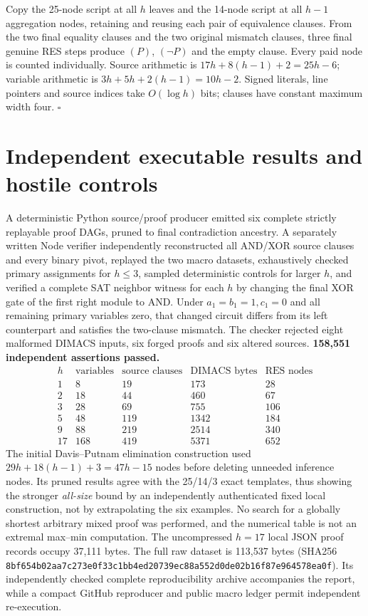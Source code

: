 \documentclass[11pt]{article}
\begin{document}
Copy the 25-node script at all $h$ leaves and the 14-node script at all $h-1$ aggregation nodes, retaining and reusing each pair of equivalence clauses. From the two final equality clauses and the two original mismatch clauses, three final genuine RES steps produce $(P)$, $(\neg P)$ and the empty clause. Every paid node is counted individually. Source arithmetic is $17h+8(h-1)+2=25h-6$; variable arithmetic is $3h+5h+2(h-1)=10h-2$. Signed literals, line pointers and source indices take $O(\log h)$ bits; clauses have constant maximum width four. \hfill$\square$

\section*{Independent executable results and hostile controls}
A deterministic Python source/proof producer emitted six complete strictly replayable proof DAGs, pruned to final contradiction ancestry. A separately written Node verifier independently reconstructed all AND/XOR source clauses and every binary pivot, replayed the two macro datasets, exhaustively checked primary assignments for $h\le3$, sampled deterministic controls for larger $h$, and verified a complete SAT neighbor witness for each $h$ by changing the final XOR gate of the first right module to AND. Under $a_1=b_1=1,c_1=0$ and all remaining primary variables zero, that changed circuit differs from its left counterpart and satisfies the two-clause mismatch. The checker rejected eight malformed DIMACS inputs, six forged proofs and six altered sources. \textbf{158,551 independent assertions passed.}
\[
\begin{array}{c|r|r|r|r}
h&\text{variables}&\text{source clauses}&\text{DIMACS bytes}&\text{RES nodes}\\\hline
1&8&19&173&28\\2&18&44&460&67\\3&28&69&755&106\\
5&48&119&1342&184\\9&88&219&2514&340\\17&168&419&5371&652
\end{array}
\]
The initial Davis--Putnam elimination construction used $29h+18(h-1)+3=47h-15$ nodes before deleting unneeded inference nodes. Its pruned results agree with the 25/14/3 exact templates, thus showing the stronger \emph{all-size} bound by an independently authenticated fixed local construction, not by extrapolating the six examples. No search for a globally shortest arbitrary mixed proof was performed, and the numerical table is not an extremal max--min computation. The uncompressed $h=17$ local JSON proof records occupy 37,111 bytes. The full raw dataset is 113,537 bytes (SHA256 \texttt{8bf654b02aa7c273e0f33c1bb4ed20739ec88a552d0de02b16f87e964578ea0f}). Its independently checked complete reproducibility archive accompanies the report, while a compact GitHub reproducer and public macro ledger permit independent re-execution.
\end{document}
